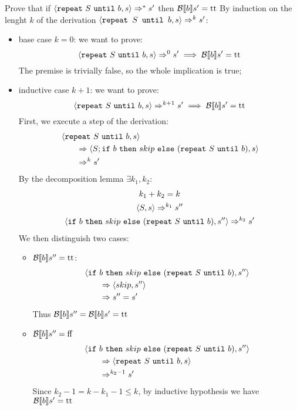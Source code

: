 \begin{exercise}{
    Prove that if $\left<\texttt{repeat}\ S\ \texttt{until}\ b, s\right> \Rightarrow^* s'$ then $\mathcal{B} \llbracket b \rrbracket s' = \text{tt}$
}
    By induction on the lenght $k$ of the derivation $\left<\texttt{repeat } S \texttt{ until } b, s\right> \Rightarrow^k s'$:
    \begin{itemize}
        \item base case $k=0$: we want to prove:
            \[ \left<\texttt{repeat}\ S\ \texttt{until}\ b, s\right> \Rightarrow^0 s' \implies \mathcal{B} \llbracket b \rrbracket s' = \text{tt} \]
            The premise is trivially false, so the whole implication is true;
        \item inductive case $k+1$: we want to prove:
            \[ \left<\texttt{repeat}\ S\ \texttt{until}\ b, s\right> \Rightarrow^{k+1} s' \implies \mathcal{B} \llbracket b \rrbracket s' = \text{tt} \]
            First, we execute a step of the derivation:
            \begin{align*}
                &\instr{\wrepeat{S}{b}}{s}
                \\&\qquad \Rightarrow \instr{S; \texttt{if}\ b\ \texttt{then}\ skip\ \texttt{else}\ (\wrepeat{S}{b})}{s}
                \\&\qquad \Rightarrow^k s'
            \end{align*}
            By the decomposition lemma $\exists k_1, k_2 :$
            \begin{gather*}
                k_1 + k_2 = k \\
                \instr{S}{s} \Rightarrow^{k_1} s'' \\
                \instr{\texttt{if}\ b\ \texttt{then}\ skip\ \texttt{else}\ (\wrepeat{S}{b})}{s''} \Rightarrow^{k_2} s'
            \end{gather*}
            We then distinguish two cases:
            \begin{itemize}
                \item $\mathcal{B} \llbracket b \rrbracket s'' = \text{tt}$:
                    \begin{align*}
                        &\instr{\texttt{if}\ b\ \texttt{then}\ skip\ \texttt{else}\ (\wrepeat{S}{b})}{s''}
                        \\&\qquad \Rightarrow \instr{skip}{s''}
                        \\&\qquad \Rightarrow s'' = s'
                    \end{align*}
                    Thus $\mathcal{B} \llbracket  b \rrbracket s'' = \mathcal{B} \llbracket  b \rrbracket s' = \text{tt}$
                \item $\mathcal{B} \llbracket  b \rrbracket s'' = \text{ff}$
                    \begin{align*}
                        &\instr{\texttt{if}\ b\ \texttt{then}\ skip\ \texttt{else}\ (\wrepeat{S}{b})}{s''}
                        \\&\qquad \Rightarrow \instr{\wrepeat{S}{b}}{s}
                        \\&\qquad \Rightarrow^{k_2 - 1} s'
                    \end{align*}
                    Since $k_2 - 1 = k - k_1 - 1 \leq k$, by inductive hypothesis we have $\mathcal{B} \llbracket  b \rrbracket s' = \text{tt}$
            \end{itemize}
    \end{itemize}
\end{exercise}
